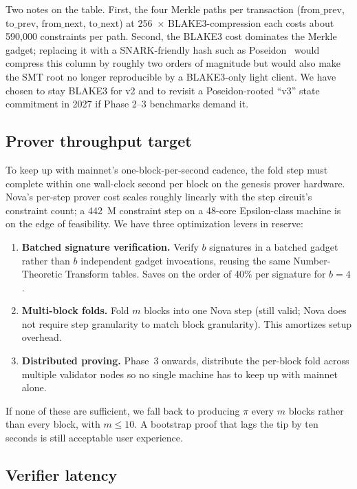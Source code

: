 \documentclass[11pt,a4paper]{article}
\begin{document}
Two notes on the table. First, the four Merkle paths per transaction
($\mathrm{from\_prev}$, $\mathrm{to\_prev}$, $\mathrm{from\_next}$,
$\mathrm{to\_next}$) at 256~$\times$ BLAKE3-compression each costs about
590{,}000 constraints per path. Second, the BLAKE3 cost dominates the
Merkle gadget; replacing it with a SNARK-friendly hash such as
Poseidon~\cite{Poseidon} would compress this column by roughly two orders
of magnitude but would also make the SMT root no longer reproducible by a
BLAKE3-only light client. We have chosen to stay BLAKE3 for v2 and to
revisit a Poseidon-rooted ``v3'' state commitment in 2027 if Phase 2--3
benchmarks demand it.

\subsection{Prover throughput target}

To keep up with mainnet's one-block-per-second cadence, the fold step
must complete within one wall-clock second per block on the genesis
prover hardware. Nova's per-step prover cost scales roughly linearly
with the step circuit's constraint count; a 442~M constraint step on
a 48-core Epsilon-class machine is on the edge of feasibility. We
have three optimization levers in reserve:

\begin{enumerate}[leftmargin=*]
  \item \textbf{Batched signature verification.} Verify $b$ signatures
        in a batched gadget rather than $b$ independent gadget invocations,
        reusing the same Number-Theoretic Transform tables. Saves on the
        order of 40\% per signature for $b = 4$.
  \item \textbf{Multi-block folds.} Fold $m$ blocks into one Nova step
        (still valid; Nova does not require step granularity to match
        block granularity). This amortizes setup overhead.
  \item \textbf{Distributed proving.} Phase~3 onwards, distribute the
        per-block fold across multiple validator nodes so no single
        machine has to keep up with mainnet alone.
\end{enumerate}

If none of these are sufficient, we fall back to producing $\pi$ every
$m$ blocks rather than every block, with $m \le 10$. A bootstrap proof
that lags the tip by ten seconds is still acceptable user experience.

\subsection{Verifier latency}
\end{document}
